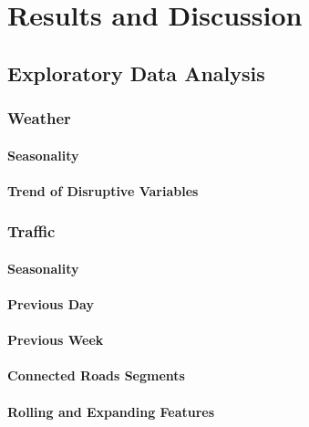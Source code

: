 \chapter{Results and Discussion}

\section{Exploratory Data Analysis}

\subsection{Weather}
\subsubsection{Seasonality}
\subsubsection{Trend of Disruptive Variables}


\subsection{Traffic}
\subsubsection{Seasonality}
\subsubsection{Previous Day}
\subsubsection{Previous Week}
\subsubsection{Connected Roads Segments}



\subsubsection{Rolling and Expanding Features}

